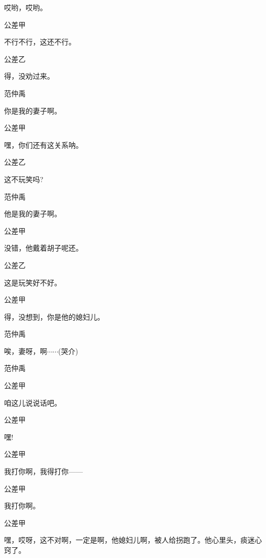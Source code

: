 哎哟，哎哟。

公差甲\hspace{20pt}~

不行不行，这还不行。

公差乙\hspace{20pt}~

得，没劝过来。

范仲禹\hspace{20pt}~

你是我的妻子啊。

公差甲\hspace{20pt}~

嘿，你们还有这关系呐。

公差乙\hspace{20pt}~

这不玩笑吗?

范仲禹\hspace{20pt}~

他是我的妻子啊。

公差甲\hspace{20pt}~

没错，他戴着胡子呢还。

公差乙\hspace{20pt}~

这是玩笑好不好。

公差甲\hspace{20pt}~

得，没想到，你是他的媳妇儿。

范仲禹\hspace{20pt}~

唉，妻呀，啊$\cdots{}\cdots{}$(哭介)

范仲禹


公差甲\hspace{20pt}~

咱这儿说说话吧。

公差甲\hspace{20pt}~

嘿!

公差甲\hspace{20pt}~

我打你啊，我得打你------

公差甲\hspace{20pt}~

我打你啊。

公差甲

嘿，哎呀，这不对啊，一定是啊，他媳妇儿啊，被人给拐跑了。他心里头，痰迷心窍了。

